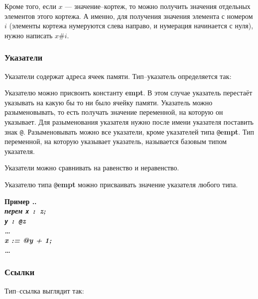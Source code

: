\documentclass[10pt]{report}
\newcounter{exam}[section]
\renewcommand{\theexam}{\thesection.\arabic{exam}}
\newenvironment{Example}{\par\refstepcounter{exam}\bf Пример \theexam. \sl}{\rm\par}
\begin{document}
Кроме того, если $x$ --- значение--кортеж, то можно получить значения отдельных элементов этого кортежа. А именно, для получения значения элемента с номером $i$ (элементы кортежа нумеруются слева направо, и нумерация начинается с нуля), нужно написать $x\texttt{\#}i$.

        \subsubsection{Указатели}
Указатели содержат адреса ячеек памяти. Тип--указатель определяется так:
\begin{center}
\noindent\textcolor{Green}{}
\end{center}

Указателю можно присвоить константу \textbf{empt}. В этом случае указатель перестаёт указывать на какую бы то ни было ячейку памяти. Указатель можно разыменовывать, то есть
получать значение переменной, на которую он указывает. Для разыменования указателя нужно после имени указателя поставить знак \texttt{@}. Разыменовывать можно все указатели,
кроме указателей типа \texttt{@}\textbf{empt}. Тип переменной, на которую указывает указатель, называется базовым типом указателя.

Указатели можно сравнивать на равенство и неравенство. 

Указателю типа \texttt{@}\textbf{empt} можно присваивать значение указателя любого типа.

\begin{Example}\\
\rm
\textbf{перем} \texttt{x : }\textbf{z};\\
\hspace*{12mm}\texttt{y : @}\textbf{z}\\
\hspace*{12mm}\dots\\
\hspace*{12mm}x := @y + 1;\\
\hspace*{12mm}\dots
\end{Example}

        \subsubsection{Ссылки}
Тип--ссылка выглядит так:        
\begin{center}
\noindent\textcolor{Green}{}
\end{center}
        
\end{document}
